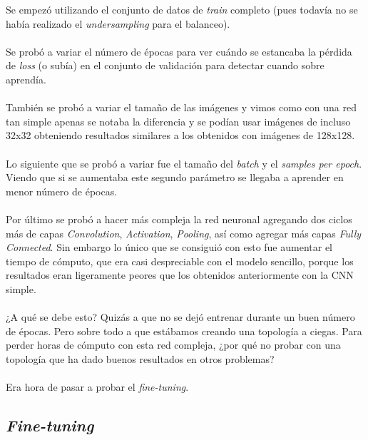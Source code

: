 Se empezó utilizando el conjunto de datos de \textit{train} completo (pues todavía no se había realizado el \textit{undersampling} para el balanceo).
\\ \\
Se probó a variar el número de épocas para ver cuándo se estancaba la pérdida de \textit{loss} (o subía) en el conjunto de validación para detectar cuando sobre aprendía.
\\ \\
También se probó a variar el tamaño de las imágenes y vimos como con una red tan simple apenas se notaba la diferencia y se podían usar imágenes de incluso 32x32 obteniendo resultados similares a los obtenidos con imágenes de 128x128.
\\ \\
Lo siguiente que se probó a variar fue el tamaño del \textit{batch} y el \textit{samples per epoch}. Viendo que si se aumentaba este segundo parámetro se llegaba a aprender en menor número de épocas.
\\ \\
Por último se probó a hacer más compleja la red neuronal agregando dos ciclos más de capas \textit{Convolution}, \textit{Activation}, \textit{Pooling}, así como agregar más capas \textit{Fully Connected}. Sin embargo lo único que se consiguió con esto fue aumentar el tiempo de cómputo, que era casi despreciable con el modelo sencillo, porque los resultados eran ligeramente peores que los obtenidos anteriormente con la CNN simple.
\\ \\
¿A qué se debe esto? Quizás a que no se dejó entrenar durante un buen número de épocas. Pero sobre todo a que estábamos creando una topología a ciegas. Para perder horas de cómputo con esta red compleja, ¿por qué no probar con una topología que ha dado buenos resultados en otros problemas?
\\ \\
Era hora de pasar a probar el \textit{fine-tuning}.

\subsection{\textit{Fine-tuning}}

